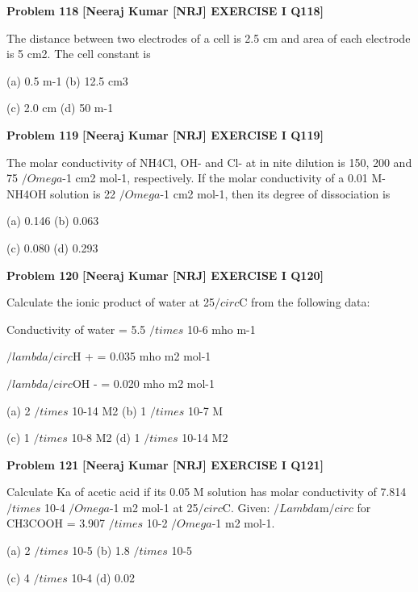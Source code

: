 \begin{problembox}
\textbf{Problem 118} \hfill \textbf{[Neeraj Kumar [NRJ] EXERCISE I Q118]}
\label{q:ext-nrj_all_questions-118}

The distance between two electrodes of a cell is 2.5 
cm and area of each electrode is 5 cm2. The cell 
constant is
 
 (a) 0.5 m-1 
(b) 12.5 cm3
 
 (c) 2.0 cm 
(d) 50 m-1
\end{problembox}

\begin{problembox}
\textbf{Problem 119} \hfill \textbf{[Neeraj Kumar [NRJ] EXERCISE I Q119]}
\label{q:ext-nrj_all_questions-119}

The molar conductivity of NH4Cl, OH- and Cl- 
at in  nite dilution is 150, 200 and 75 $/Omega$-1 cm2 
mol-1, respectively. If the molar conductivity of 
a 0.01 M-NH4OH solution is 22 $/Omega$-1 cm2 mol-1, 
then its degree of dissociation is
 
 (a) 0.146 
(b) 0.063
 
 (c) 0.080 
(d) 0.293
\end{problembox}

\begin{problembox}
\textbf{Problem 120} \hfill \textbf{[Neeraj Kumar [NRJ] EXERCISE I Q120]}
\label{q:ext-nrj_all_questions-120}

Calculate the ionic product of water at 25$/circ$C from 
the following data:
 
   Conductivity of water = 5.5 $/times$ 10-6 mho m-1
 
  $/lambda$$/circ$H
+ = 0.035 mho m2 mol-1
 
  $/lambda$$/circ$OH
- = 0.020 mho m2 mol-1
 
 (a) 2 $/times$ 10-14 M2 
(b) 1 $/times$ 10-7 M
 
 (c) 1 $/times$ 10-8 M2 
(d) 1 $/times$ 10-14 M2
\end{problembox}

\begin{problembox}
\textbf{Problem 121} \hfill \textbf{[Neeraj Kumar [NRJ] EXERCISE I Q121]}
\label{q:ext-nrj_all_questions-121}

Calculate Ka of acetic acid if its 0.05 M solution has 
molar conductivity of 7.814 $/times$ 10-4 $/Omega$-1 m2 mol-1 
at 25$/circ$C. Given: $/Lambda$m$/circ$ for CH3COOH = 3.907 $/times$ 10-2 
$/Omega$-1 m2 mol-1.
 
 (a) 2 $/times$ 10-5 
(b) 1.8 $/times$ 10-5
 
 (c) 4 $/times$ 10-4 
(d) 0.02
\end{problembox}


